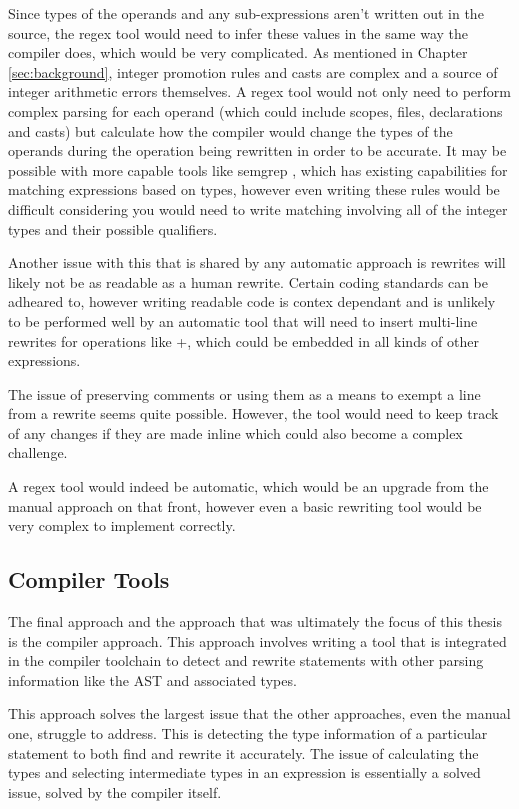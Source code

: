 Since types of the operands and any sub-expressions aren't written out in the source, the regex tool would need to infer these values in the same way the compiler does, which would be very complicated. As mentioned in Chapter \ref{sec:background}, integer promotion rules and casts are complex and a source of integer arithmetic errors themselves. A regex tool would not only need to perform complex parsing for each operand (which could include scopes, files, declarations and casts) but calculate how the compiler would change the types of the operands during the operation being rewritten in order to be accurate. It may be possible with more capable tools like semgrep \cite{semgrep}, which has existing capabilities for matching expressions based on types, however even writing these rules would be difficult considering you would need to write matching involving all of the integer types and their possible qualifiers.

Another issue with this that is shared by any automatic approach is rewrites will likely not be as readable as a human rewrite. Certain coding standards can be adheared to, however writing readable code is contex dependant and is unlikely to be performed well by an automatic tool that will need to insert multi-line rewrites for operations like +, which could be embedded in all kinds of other expressions.

The issue of preserving comments or using them as a means to exempt a line from a rewrite seems quite possible. However, the tool would need to keep track of any changes if they are made inline which could also become a complex challenge.

A regex tool would indeed be automatic, which would be an upgrade from the manual approach on that front, however even a basic rewriting tool would be very complex to implement correctly.

\subsection{Compiler Tools}

The final approach and the approach that was ultimately the focus of this thesis is the compiler approach.
This approach involves writing a tool that is integrated in the compiler toolchain to detect and rewrite statements with other parsing information like the AST and associated types.

This approach solves the largest issue that the other approaches, even the manual one, struggle to address. This is detecting the type information of a particular statement to both find and rewrite it accurately. The issue of calculating the types and selecting intermediate types in an expression is essentially a solved issue, solved by the compiler itself.

